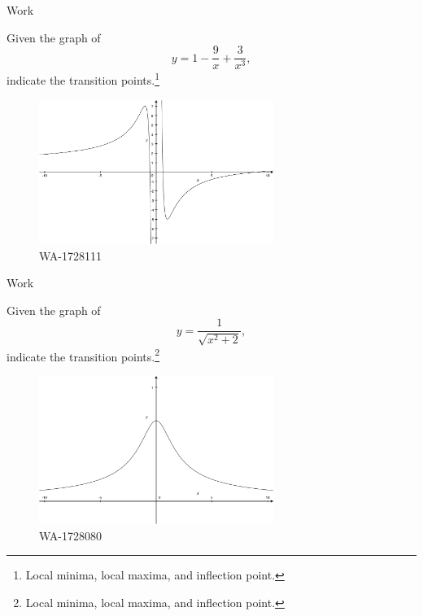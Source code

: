 \documentclass[12pt,addpoints, answers, fleqn]{exam}
\begin{document}
\begin{teacher}
\begin{questions}
\begin{solution}
Work
\end{solution}

\question 	%

Given the graph of
\[
y =1 - \frac{9}{x} + \frac{3}{x^3},
\]
indicate the transition points.\footnote{Local minima, local maxima, and inflection point.}

\begin{figure}[htbp] %
   \centering
   \includegraphics[width=3in]{./graphics/1728111.pdf} 
   \caption{WA-1728111}
   \label{fig:1728111}
\end{figure}

\begin{solution}
Work
\end{solution}

\question 	%

Given the graph of
\[
y = \frac{1}{\sqrt{x^2+2}},
\]
indicate the transition points.\footnote{Local minima, local maxima, and inflection point.}

\begin{figure}[htbp] %
   \centering
   \includegraphics[width=3in]{./graphics/1728080.pdf} 
   \caption{WA-1728080}
   \label{fig:1728080}
\end{figure}

\end{questions}
\end{teacher}
\vfill
\pagebreak
\end{document}
